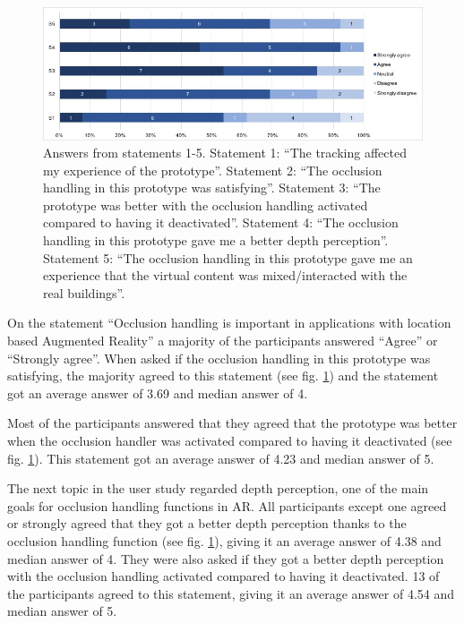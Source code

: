 \begin{figure}
\includegraphics[width=490px]{_image_user-licert}
\caption{Answers from statements 1-5. Statement 1: ``The tracking affected my experience of the prototype''. Statement 2: ``The occlusion handling in this prototype was satisfying''. Statement 3: ``The prototype was better with the occlusion handling activated compared to having it deactivated''. Statement 4: ``The occlusion handling in this prototype gave me a better depth perception''. Statement 5: ``The occlusion handling in this prototype gave me an experience that the virtual content was mixed/interacted with the real buildings''.}
\label{fig:_image_user-licert}
\end{figure}

On the statement ``Occlusion handling is important in applications with location based Augmented Reality'' a majority of the participants answered ``Agree'' or ``Strongly agree''. When asked if the occlusion handling in this prototype was satisfying, the majority agreed to this statement (see fig.  \ref{fig:_image_user-licert}) and the statement got an average answer of 3.69 and median answer of 4.

Most of the participants answered that they agreed that the prototype was better when the occlusion handler was activated compared to having it deactivated (see fig. \ref{fig:_image_user-licert}). This statement got an average answer of 4.23 and median answer of 5. 

The next topic in the user study regarded depth perception, one of the main goals for occlusion handling functions in AR. All participants except one agreed or strongly agreed that they got a better depth perception thanks to the occlusion handling function (see fig. \ref{fig:_image_user-licert}), giving it an average answer of 4.38 and median answer of 4. They were also asked if they got a better depth perception with the occlusion handling activated compared to having it deactivated. 13 of the participants agreed to this statement, giving it an average answer of 4.54 and median answer of 5.

